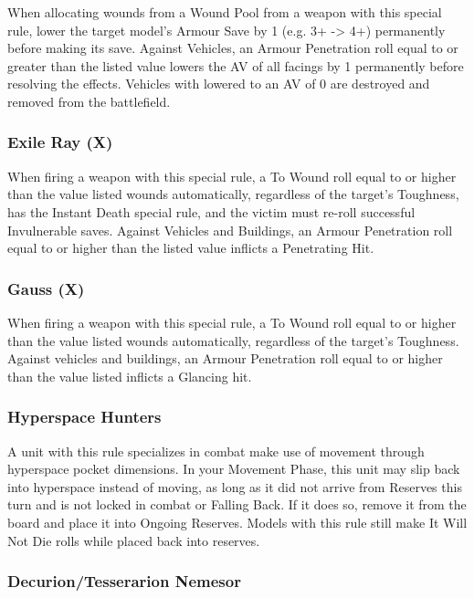 \begin{multicols}{2}
When allocating wounds from a Wound Pool from a weapon with this special rule, lower the target model's Armour Save by 1 (e.g. 3+ -> 4+) permanently before making its save. Against Vehicles, an Armour Penetration roll equal to or greater than the listed value lowers the AV of all facings by 1 permanently before resolving the effects. Vehicles with lowered to an AV of 0 are destroyed and removed from the battlefield.


\subsubsection{Exile Ray (X)} \label{Exile Ray}

When firing a weapon with this special rule, a To Wound roll equal to or higher than the value listed wounds automatically, regardless of the target's Toughness, has the Instant Death special rule, and the victim must re-roll successful Invulnerable saves. Against Vehicles and Buildings, an Armour Penetration roll equal to or higher than the listed value inflicts a Penetrating Hit.

\subsubsection{Gauss (X)} \label{Gauss}

When firing a weapon with this special rule, a To Wound roll equal to or higher than the value listed wounds automatically, regardless of the target’s Toughness. Against vehicles and buildings, an Armour Penetration roll equal to or higher than the value listed inflicts a Glancing hit.

\subsubsection{Hyperspace Hunters} \label{Hyperspace Hunters}

A unit with this rule specializes in combat make use of movement through hyperspace pocket dimensions. In your Movement Phase, this unit may slip back into hyperspace instead of moving, as long as it did not arrive from Reserves this turn and is not locked in combat or Falling Back. If it does so, remove it from the board and place it into Ongoing Reserves. Models with this rule still make It Will Not Die rolls while placed back into reserves.

\subsubsection{Decurion/Tesserarion Nemesor} \label{Decurion Nemesor} \label{Tesserarion Nemesor}


\end{multicols}
